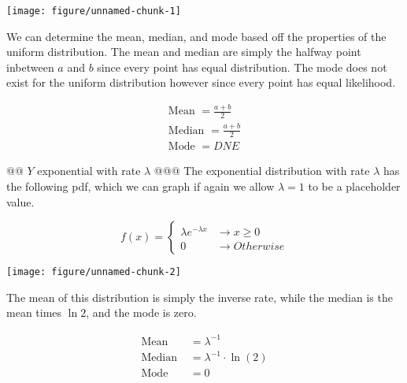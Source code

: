\documentclass[10pt]{article}\usepackage[]{graphicx}\usepackage[]{xcolor}
\makeatletter
\def\maxwidth{ %
  \ifdim\Gin@nat@width>\linewidth
    \linewidth
  \else
    \Gin@nat@width
  \fi
}
\newenvironment{knitrout}{}{} %
\makeatother
\begin{document}
\begin{easylist}[enumerate]
\begin{knitrout}
\color{fgcolor}

{\centering \texttt{[image: figure/unnamed-chunk-1]} 

}



\end{knitrout}


    We can determine the mean, median, and mode based off the properties of the uniform distribution. The mean and
    median are simply the halfway point inbetween $a$ and $b$ since every point has equal distribution. The mode does
    not exist for the uniform distribution however since every point has equal likelihood.

    \[
        \begin{aligned}
            \text{Mean } = \frac{a + b}{2}\\
            \text{Median } = \frac{a + b}{2}\\
            \text{Mode } = DNE
        \end{aligned}
    \]

    @@ $Y$ exponential with rate $\lambda$
    @@@ The exponential distribution with rate $\lambda$ has the following pdf, which we can graph if again we allow
    $\lambda=1$ to be a placeholder value.

    \[
        f(x) =
        \begin{cases}
            \lambda e^{-\lambda x} &\to x \ge 0\\
            0 &\to Otherwise
        \end{cases}
    \]

\begin{knitrout}
\color{fgcolor}

{\centering \texttt{[image: figure/unnamed-chunk-2]} 

}



\end{knitrout}


    The mean of this distribution is simply the inverse rate, while the median is the mean times $\ln 2$, and the mode
    is zero.

    \[
        \begin{aligned}
            \text{Mean } &= \lambda^{-1}\\
            \text{Median } &= \lambda^{-1} \cdot \ln(2)\\
            \text{Mode } &= 0
        \end{aligned}
    \]


\end{easylist}
\end{document}
